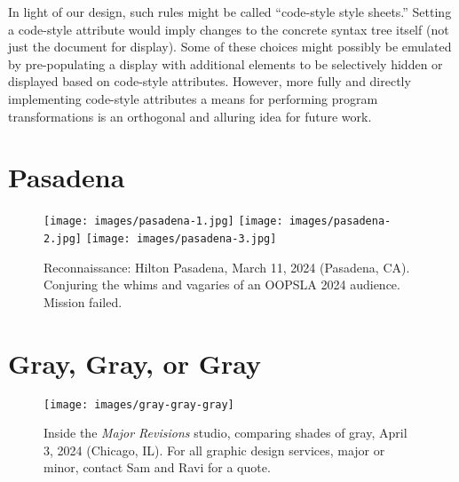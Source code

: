 \documentclass[acmsmall, screen]{acmart}
\begin{document}
In light of our design, such rules might be called ``code-style style sheets.''
Setting a code-style attribute would imply changes to the concrete syntax tree itself (not just the document for display).
Some of these choices might possibly be emulated by pre-populating a display with additional elements to be selectively hidden or displayed based on code-style attributes.
However, more fully and directly implementing code-style attributes a means for performing program transformations is an orthogonal and alluring idea for future work.
 
\clearpage
\section{Pasadena}

\begin{figure}[h]
\texttt{[image: images/pasadena-1.jpg]}
\texttt{[image: images/pasadena-2.jpg]}
\texttt{[image: images/pasadena-3.jpg]}
\caption{Reconnaissance: Hilton Pasadena, March 11, 2024 (Pasadena, CA). Conjuring the whims and vagaries of an OOPSLA 2024 audience. Mission failed.}
\end{figure}
 \section{Gray, Gray, or Gray}

\begin{figure}[h]
\texttt{[image: images/gray-gray-gray]}
\caption{Inside the \emph{Major Revisions} studio, comparing shades of gray, April 3, 2024 (Chicago, IL). For all graphic design services, major or minor, contact Sam and Ravi for a quote.}
\end{figure}
 
\end{document}
